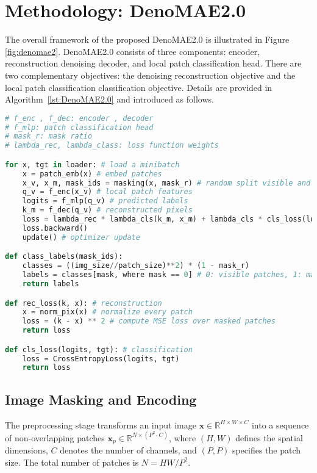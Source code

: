 \section{Methodology: DenoMAE2.0}

The overall framework of the proposed DenoMAE2.0 is illustrated in Figure \ref{fig:denomae2}. DenoMAE2.0 consists of three components: encoder, reconstruction denoising decoder, and local patch classification head. There are two complementary objectives: the denoising reconstruction objective and the local patch classification classification objective. Details are provided in Algorithm~\ref{lst:DenoMAE2.0} and introduced as follows.

\begin{lstlisting}[language=Python, caption={DenoMAE2.0, PyTorch-like pseudo code}, label={lst:DenoMAE2.0}]
# f_enc , f_dec: encoder , decoder
# f_mlp: patch classification head
# mask_r: mask ratio
# lambda_rec, lambda_class: loss function weights

for x, tgt in loader: # load a minibatch
    x = patch_emb(x) # embed patches
    x_v, x_m, mask_ids = masking(x, mask_r) # random split visible and masked patches
    q_v = f_enc(x_v) # local patch features
    logits = f_mlp(q_v) # predicted labels
    k_m = f_dec(q_v) # reconstructed pixels
    loss = lambda_rec * lambda_cls(k_m, x_m) + lambda_cls * cls_loss(logits, tgt)
    loss.backward()
    update() # optimizer update

def class_labels(mask_ids):
    classes = ((img_size//patch_size)**2) * (1 - mask_r)
    labels = classes[mask, where mask == 0] # 0: visible patches, 1: masked patches
    return labels

def rec_loss(k, x): # reconstruction
    x = norm_pix(x) # normalize every patch
    loss = (k - x) ** 2 # compute MSE loss over masked patches
    return loss

def cls_loss(logits, tgt): # classification
    loss = CrossEntropyLoss(logits, tgt)
    return loss
\end{lstlisting}

\subsection{Image Masking and Encoding}

The preprocessing stage transforms an input image $\mathbf{x} \in \mathbb{R}^{H \times W \times C}$ into a sequence of non-overlapping patches $\mathbf{x}_p \in \mathbb{R}^{N \times (P^2 \cdot C)}$, where $(H, W)$ defines the spatial dimensions, $C$ denotes the number of channels, and $(P, P)$ specifies the patch size. The total number of patches is $N = HW/P^2$. 

